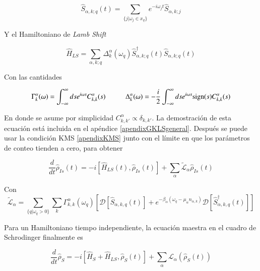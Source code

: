 \begin{equation*}
    \hat{S}_{\alpha,k;q}(t) = \sum_{\{j|\omega_{j}\in x_{q} \} } e^{-i\omega_{j}t}\hat{S}_{\alpha,k;j}
\end{equation*}

Y el Hamiltoniano de \textit{Lamb Shift}

\begin{equation*}
    \hat{H}_{LS} = \sum_{\alpha,k;q} \Delta^{\alpha}_{k}(\omega_{q}) \hat{S}^{\dagger}_{\alpha,k;q}(t)\hat{S}_{\alpha,k;q}(t)
\end{equation*}

Con las cantidades

\begin{equation*}
    \Gamma_{k}^{\alpha}(\omega) = \int_{-\infty}^{\infty}ds e^{i\omega s}C^{\alpha}_{k,k}(s) \hspace{10mm} \Delta^{\alpha}_{k}(\omega) = - \frac{i}{2} \int^{\infty}_{-\infty}ds e^{i\omega s} \text{sign}(s)C^{\alpha}_{k,k}(s)
\end{equation*}

En donde se asume por simplicidad $C^{\alpha}_{k,k'} \propto \delta_{k,k'}$. La demostración de esta ecuación está incluida en el apéndice \ref{apendixGKLSgeneral}. Después se puede usar la condición KMS \ref{apendixKMS} junto con el límite en que  los parámetros de conteo tienden a cero, para obtener

\begin{equation*}
    \frac{d}{dt}\hat{\rho}_{Is}(t) = - i[\hat{H}_{LS}(t),\hat{\rho}_{Is}(t)] + \sum_{\alpha}\tilde{\mathcal{L}}_{\alpha} \hat{\rho}_{Is}(t)
\end{equation*}

Con
\begin{equation*}
    \tilde{\mathcal{L}}_{\alpha} = \sum_{\{q|\omega_{q}>0\}} \sum_{k}\Gamma^{\alpha}_{k,k}(\omega_{q}) \left[ \mathcal{D}[\hat{S}_{\alpha,k,q}(t)] + e^{-\beta_{\alpha}(\omega_{q} - \mu_{\alpha}n_{\alpha,k})}\mathcal{D}[\hat{S}^{\dagger}_{\alpha,k,q}(t)]  \right]
\end{equation*}

Para un Hamiltoniano tiempo independiente, la ecuación maestra en el cuadro de Schrodinger finalmente es

\begin{equation}
    \frac{d}{dt}\hat{\rho}_{S} = -i [\hat{H}_{S}+ \hat{H}_{LS},\hat{\rho}_{S}(t)] + \sum_{\alpha}\mathcal{L}_{\alpha}(\hat{\rho}_{S}(t))
\label{sec2schrodingerthermo}
\end{equation}

